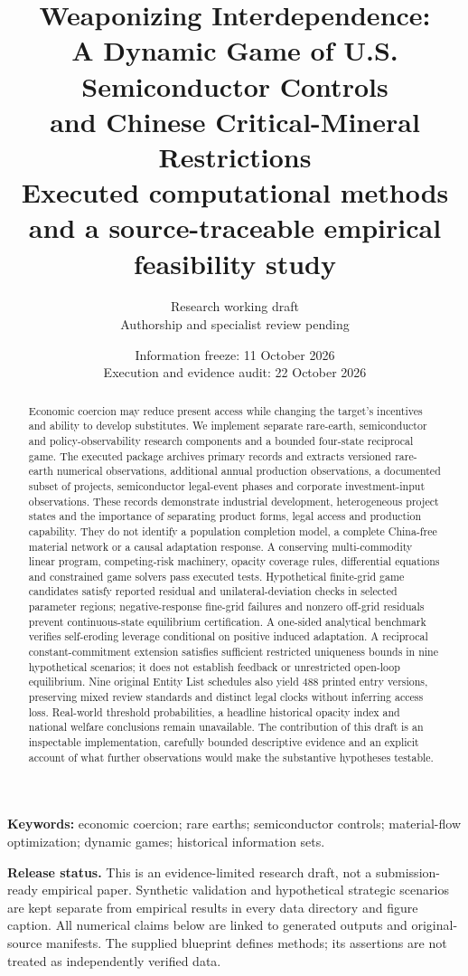 \documentclass[11pt]{article}
\title{Weaponizing Interdependence:\\A Dynamic Game of U.S. Semiconductor Controls\\and Chinese Critical-Mineral Restrictions\\[0.6em]
\large Executed computational methods and a source-traceable empirical feasibility study}
\author{Research working draft\\Authorship and specialist review pending}
\date{Information freeze: 11 October 2026\\Execution and evidence audit: 22 October 2026}
\begin{document}
\maketitle
\begin{abstract}
Economic coercion may reduce present access while changing the target's incentives and ability to develop substitutes. We implement separate rare-earth, semiconductor and policy-observability research components and a bounded four-state reciprocal game. The executed package archives primary records and extracts \RareObs{} versioned rare-earth numerical observations, \LynasObs{} additional annual production observations, a documented subset of \ProjectCount{} projects, \LegalRows{} semiconductor legal-event phases and \FinancialRows{} corporate investment-input observations. These records demonstrate industrial development, heterogeneous project states and the importance of separating product forms, legal access and production capability. They do not identify a population completion model, a complete China-free material network or a causal adaptation response. A conserving multi-commodity linear program, competing-risk machinery, opacity coverage rules, differential equations and constrained game solvers pass \TestCount{} executed tests. Hypothetical finite-grid game candidates satisfy reported residual and unilateral-deviation checks in selected parameter regions; negative-response fine-grid failures and nonzero off-grid residuals prevent continuous-state equilibrium certification. A one-sided analytical benchmark verifies self-eroding leverage conditional on positive induced adaptation. A reciprocal constant-commitment extension satisfies sufficient restricted uniqueness bounds in nine hypothetical scenarios; it does not establish feedback or unrestricted open-loop equilibrium. Nine original Entity List schedules also yield 488 printed entry versions, preserving mixed review standards and distinct legal clocks without inferring access loss. Real-world threshold probabilities, a headline historical opacity index and national welfare conclusions remain unavailable. The contribution of this draft is an inspectable implementation, carefully bounded descriptive evidence and an explicit account of what further observations would make the substantive hypotheses testable.
\end{abstract}
\textbf{Keywords:} economic coercion; rare earths; semiconductor controls; material-flow optimization; dynamic games; historical information sets.

\textbf{Release status.} This is an evidence-limited research draft, not a submission-ready empirical paper. Synthetic validation and hypothetical strategic scenarios are kept separate from empirical results in every data directory and figure caption. All numerical claims below are linked to generated outputs and original-source manifests. The supplied blueprint defines methods; its assertions are not treated as independently verified data.
\tableofcontents
\newpage
\end{document}
